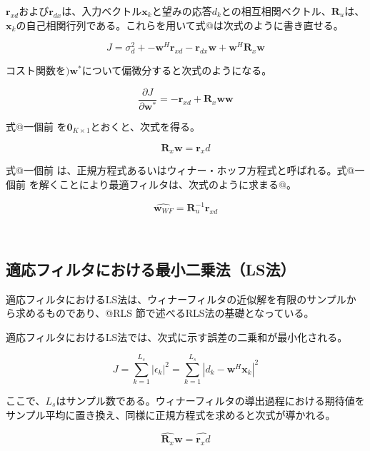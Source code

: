 \(\bm{r}_{xd}\)および\(\bm{r}_{dx}\)は、入力ベクトル\(\bm{x}_k\)と望みの応答\(d_k\)との相互相関ベクトル、\(\bm{R}_u\)は、\(\bm{x}_k\)の自己相関行列である。これらを用いて式@は次式のように書き直せる。

\begin{equation}
J =\sigma_d^2 + - \bm{w}^H \bm{r}_{xd} -\bm{r}_{dx} \bm{w} + \bm{w}^H \bm{R}_x \bm{w}
\end{equation}

コスト関数を\()\bm{w}^*\)について偏微分すると次式のようになる。

\begin{equation}
\frac{\partial J}{\partial \bm{w}^*} = - \bm{r}_{xd} + \bm{R}_x \bm{w}
\bm{w}
\end{equation}

式@一個前 を\(\bm{0}_{K \times 1}\)とおくと、次式を得る。

\begin{equation}
\bm{R}_x \bm{w} = \bm{r}_xd
\end{equation}

式@一個前
は、正規方程式あるいはウィナー・ホッフ方程式と呼ばれる。式@一個前
を解くことにより最適フィルタは、次式のように求まる@。

\begin{equation}
\hat{\bm{w}_{WF}} = \bm{R}_u^{-1} \bm{r}_{xd}
\end{equation}

\
\subsection{適応フィルタにおける最小二乗法（LS法）}\label{ls}

適応フィルタにおけるLS法は、ウィナーフィルタの近似解を有限のサンプルから求めるものであり、@RLS
節で述べるRLS法の基礎となっている。

適応フィルタにおけるLS法では、次式に示す誤差の二乗和が最小化される。

\begin{equation}
J = \sum_{k=1}^{L_s} |\epsilon_k|^2 = \sum_{k=1}^{L_s} |d_k - \bm{w}^H \bm{x}_k|^2
\end{equation}

ここで、\(L_s\)はサンプル数である。ウィナーフィルタの導出過程における期待値をサンプル平均に置き換え、同様に正規方程式を求めると次式が導かれる。

\begin{equation}
\hat{\bm{R}_x} \bm{w} = \hat{\bm{r}_xd}
\end{equation}

